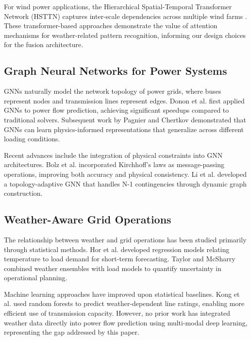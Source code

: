 \documentclass[journal,12pt,onecolumn]{IEEEtran}
\begin{document}
For wind power applications, the Hierarchical Spatial-Temporal Transformer Network (HSTTN) captures inter-scale dependencies across multiple wind farms \cite{ref15}. These transformer-based approaches demonstrate the value of attention mechanisms for weather-related pattern recognition, informing our design choices for the fusion architecture.

\subsection{Graph Neural Networks for Power Systems}

GNNs naturally model the network topology of power grids, where buses represent nodes and transmission lines represent edges. Donon et al. \cite{ref16} first applied GNNs to power flow prediction, achieving significant speedups compared to traditional solvers. Subsequent work by Pagnier and Chertkov \cite{ref17} demonstrated that GNNs can learn physics-informed representations that generalize across different loading conditions.

Recent advances include the integration of physical constraints into GNN architectures. Bolz et al. \cite{ref18} incorporated Kirchhoff's laws as message-passing operations, improving both accuracy and physical consistency. Li et al. \cite{ref19} developed a topology-adaptive GNN that handles N-1 contingencies through dynamic graph construction.

\subsection{Weather-Aware Grid Operations}

The relationship between weather and grid operations has been studied primarily through statistical methods. Hor et al. \cite{ref20} developed regression models relating temperature to load demand for short-term forecasting. Taylor and McSharry \cite{ref21} combined weather ensembles with load models to quantify uncertainty in operational planning.

Machine learning approaches have improved upon statistical baselines. Kong et al. \cite{ref22} used random forests to predict weather-dependent line ratings, enabling more efficient use of transmission capacity. However, no prior work has integrated weather data directly into power flow prediction using multi-modal deep learning, representing the gap addressed by this paper.

\end{document}
